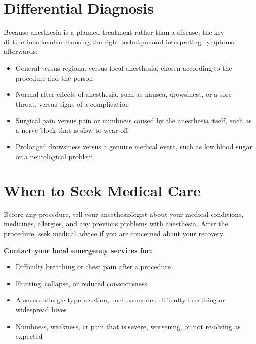 \section*{Differential Diagnosis}
Because anesthesia is a planned treatment rather than a disease, the key distinctions involve choosing the right technique and interpreting symptoms afterwards:
\begin{itemize}
    \item General versus regional versus local anesthesia, chosen according to the procedure and the person
    \item Normal after-effects of anesthesia, such as nausea, drowsiness, or a sore throat, versus signs of a complication
    \item Surgical pain versus pain or numbness caused by the anesthesia itself, such as a nerve block that is slow to wear off
    \item Prolonged drowsiness versus a genuine medical event, such as low blood sugar or a neurological problem
\end{itemize}

\section*{When to Seek Medical Care}
Before any procedure, tell your anesthesiologist about your medical conditions, medicines, allergies, and any previous problems with anesthesia. After the procedure, seek medical advice if you are concerned about your recovery.

\textbf{Contact your local emergency services for:}
\begin{itemize}
    \item Difficulty breathing or chest pain after a procedure
    \item Fainting, collapse, or reduced consciousness
    \item A severe allergic-type reaction, such as sudden difficulty breathing or widespread hives
    \item Numbness, weakness, or pain that is severe, worsening, or not resolving as expected
\end{itemize}

